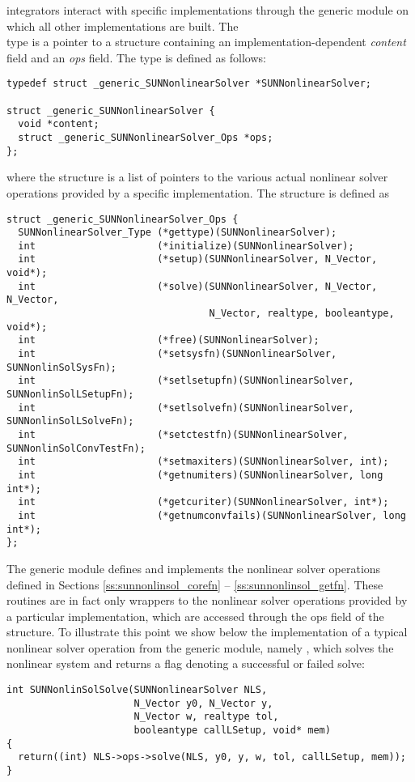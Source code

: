{\sundials} integrators interact with specific {\sunnonlinsol}
implementations through the generic {\sunnonlinsol} module on which all
other {\sunnonlinsol} implementations are built. The \\ \noindent 
{} type is a pointer to a structure containing an
implementation-dependent \textit{content} field and an \textit{ops}
field. The type  is defined as follows:
\begin{verbatim}
typedef struct _generic_SUNNonlinearSolver *SUNNonlinearSolver;

struct _generic_SUNNonlinearSolver {
  void *content;
  struct _generic_SUNNonlinearSolver_Ops *ops;
};
\end{verbatim}
where the  structure is a list of
pointers to the various actual nonlinear solver operations provided by a
specific implementation. The 
structure is defined as
\begin{verbatim}
struct _generic_SUNNonlinearSolver_Ops {
  SUNNonlinearSolver_Type (*gettype)(SUNNonlinearSolver);
  int                     (*initialize)(SUNNonlinearSolver);
  int                     (*setup)(SUNNonlinearSolver, N_Vector, void*);
  int                     (*solve)(SUNNonlinearSolver, N_Vector, N_Vector,
                                   N_Vector, realtype, booleantype, void*);
  int                     (*free)(SUNNonlinearSolver);
  int                     (*setsysfn)(SUNNonlinearSolver, SUNNonlinSolSysFn);
  int                     (*setlsetupfn)(SUNNonlinearSolver, SUNNonlinSolLSetupFn);
  int                     (*setlsolvefn)(SUNNonlinearSolver, SUNNonlinSolLSolveFn);
  int                     (*setctestfn)(SUNNonlinearSolver, SUNNonlinSolConvTestFn);
  int                     (*setmaxiters)(SUNNonlinearSolver, int);
  int                     (*getnumiters)(SUNNonlinearSolver, long int*);
  int                     (*getcuriter)(SUNNonlinearSolver, int*);
  int                     (*getnumconvfails)(SUNNonlinearSolver, long int*);
};
\end{verbatim}
The generic {\sunnonlinsol} module defines and implements the nonlinear
solver operations defined in Sections \ref{ss:sunnonlinsol_corefn}
-- \ref{ss:sunnonlinsol_getfn}. These routines are in fact only
wrappers to the nonlinear solver operations provided by a particular
{\sunnonlinsol} implementation, which are accessed through the ops
field of the  structure. To illustrate this
point we show below the implementation of a typical nonlinear solver
operation from the generic {\sunnonlinsol} module, namely
, which solves the nonlinear system and returns a flag
denoting a successful or failed solve:
\begin{verbatim}
int SUNNonlinSolSolve(SUNNonlinearSolver NLS,
                      N_Vector y0, N_Vector y,
                      N_Vector w, realtype tol,
                      booleantype callLSetup, void* mem)
{
  return((int) NLS->ops->solve(NLS, y0, y, w, tol, callLSetup, mem));
}
\end{verbatim}

